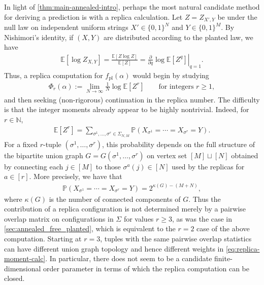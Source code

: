 \documentclass[11pt]{amsart}
\numberwithin{equation}{section}
\numberwithin{equation}{section}
\newcommand{\1}{\mathbbm{1}}
\newcommand{\E}{\mathbb{E}}
\newcommand{\Prob}{\mathbb{P}}
\newcommand{\N}{\mathbb{N}}
\newcommand{\fpl}{f_{\mathrm{pl}}}
\theoremstyle{definition}
\begin{document}
\medskip

 In light of \cref{thm:main-annealed-intro}, perhaps the most natural candidate method for deriving a prediction is with a replica calculation. Let $Z = Z_{X',Y}$ be under the null law on independent uniform strings $X' \in \{0,1\}^N$ and $Y \in \{0,1\}^M$. By Nishimori's identity, if $(X,Y)$ are distributed according to the planted law, we have
\begin{align*}
    \E[\log Z_{X,Y}] = \frac{\E[Z\log Z]}{\E[Z]} = \left.\frac{\partial}{\partial q} \log \E[Z^q]\right|_{q=1}.
\end{align*}
Thus, a replica computation for $\fpl(\alpha)$ would begin by studying
\begin{align*}
    \Phi_r(\alpha) := \lim_{N\to\infty}\frac1N\log \E[Z^r] \qquad\text{for integers } r \ge 1,
\end{align*}
and then seeking (non-rigorous) continuation in the replica number. The difficulty is that the integer moments already appear to be highly nontrivial. Indeed, for $r \in \N$,
\begin{align} \label{eq:replica-moment-calc}
    \E[Z^r] = \sum_{\sigma^1,\dots,\sigma^r\in\Sigma_{N,M}} \Prob\left( X_{\sigma^1} = \cdots = X_{\sigma^r}=Y \right).
\end{align}
For a fixed $r$-tuple $\left(\sigma^1,\dots,\sigma^r\right)$, this probability depends on the full structure of the bipartite union graph $G = G\left(\sigma^1,\dots,\sigma^r\right)$ on vertex set $[M] \sqcup [N]$ obtained by connecting each $j \in [M]$ to those $\sigma^a(j) \in [N]$ used by the replicas for $a \in [r]$. More precisely, we have that
\begin{align*}
    \Prob\left( X_{\sigma^1} = \cdots = X_{\sigma^r}=Y \right) = 2^{\kappa(G)-(M+N)},
\end{align*}
where $\kappa(G)$ is the number of connected components of $G$. Thus the contribution of a replica configuration is not determined merely by a pairwise overlap matrix on configurations in $\Sigma$ for values $r \geq 3$, as was the case in \cref{sec:annealed_free_planted}, which is equivalent to the $r=2$ case of the above computation. Starting at $r=3$, tuples with the same pairwise overlap statistics can have different union graph topology and hence different weights in \eqref{eq:replica-moment-calc}. In particular, there does not seem to be a candidate finite-dimensional order parameter in terms of which the replica computation can be closed.

\medskip
\end{document}
